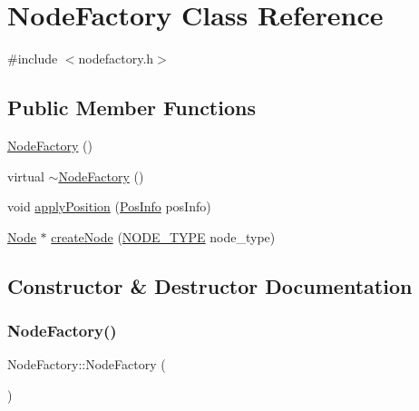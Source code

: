 \hypertarget{classNodeFactory}{}\section{Node\+Factory Class Reference}
\label{classNodeFactory}


{\ttfamily \#include $<$nodefactory.\+h$>$}

\subsection*{Public Member Functions}
\begin{DoxyCompactItemize}
\item 
\hyperlink{classNodeFactory_ac12b3627ac674658d29e4083a73b1e43}{Node\+Factory} ()
\item 
virtual \hyperlink{classNodeFactory_a1ce6fde33ca914e0b70f80ce2c730e37}{$\sim$\+Node\+Factory} ()
\item 
void \hyperlink{classNodeFactory_a9eb2e94e99b0c087968e76775fbbdf07}{apply\+Position} (\hyperlink{classPosInfo}{Pos\+Info} pos\+Info)
\item 
\hyperlink{classNode}{Node} $\ast$ \hyperlink{classNodeFactory_ac8757ee2441a4439b8bda6ed5296ede1}{create\+Node} (\hyperlink{statics_8h_a1ec6d4bfce2e004debbc141eafc512db}{N\+O\+D\+E\+\_\+\+T\+Y\+PE} node\+\_\+type)
\end{DoxyCompactItemize}


\subsection{Constructor \& Destructor Documentation}
\mbox{\label{classNodeFactory_ac12b3627ac674658d29e4083a73b1e43}} 
\subsubsection{\texorpdfstring{Node\+Factory()}{NodeFactory()}}
{\footnotesize\ttfamily Node\+Factory\+::\+Node\+Factory (\begin{DoxyParamCaption}{ }\end{DoxyParamCaption})}

\mbox{\label{classNodeFactory_a1ce6fde33ca914e0b70f80ce2c730e37}} 
